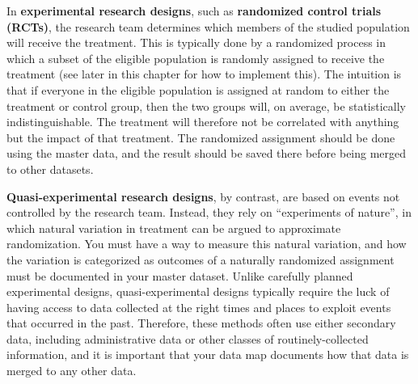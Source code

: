 In \textbf{experimental research designs}, 
such as \textbf{randomized control trials (RCTs)},
 
the research team determines which members
of the studied population will receive the treatment.
This is typically done by a randomized process
in which a subset of the eligible population
is randomly assigned to receive the treatment
(see later in this chapter for how to implement this).
The intuition is that if everyone in the eligible population
is assigned at random to either the treatment or control group,
then the two groups will, on average, be statistically indistinguishable.
The treatment will therefore not be correlated with anything
but the impact of that treatment.\cite{duflo2007using}
The randomized assignment should be done using the master data,
and the result should be saved there before being merged to other datasets.


\textbf{Quasi-experimental research designs},
by contrast, are based on events not controlled by the research team.
Instead, they rely on ``experiments of nature'',
in which natural variation in treatment can be argued to approximate randomization.
You must have a way to measure this natural variation,
and how the variation is categorized as outcomes of a naturally randomized assignment
must be documented in your master dataset.
Unlike carefully planned experimental designs,
quasi-experimental designs typically require the luck
of having access to data collected at the right times and places
to exploit events that occurred in the past.
Therefore, these methods often use either secondary data,
including administrative data or other classes of routinely-collected information,
and it is important that your data map documents 
how that data is merged to any other data.



